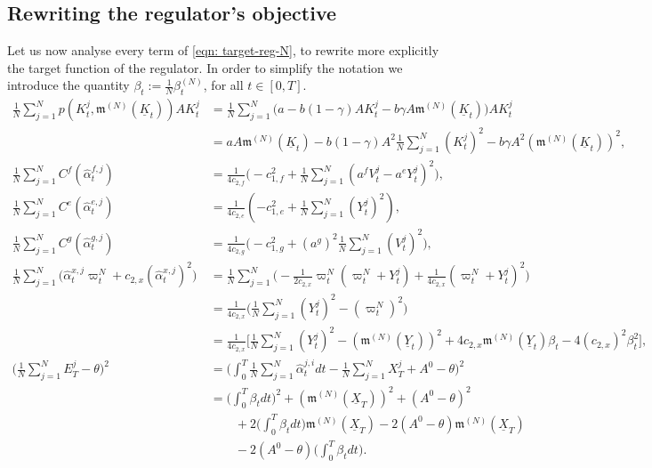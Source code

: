 \documentclass[11pt,twoside]{amsart}
\theoremstyle{definition}
\numberwithin{equation}{section}
\newcommand{\w}{\varpi}
\renewcommand{\hat}{\widehat}
\newcommand{\avg}{\frac{1}{N}\sum_{j = 1}^N}
\begin{document}
\subsection{Rewriting the regulator's objective}\label{subsect_model_N:regulator_rewritten}

Let us now analyse every term of \eqref{eqn: target-reg-N}, to rewrite more explicitly the target function of the regulator. 
In order to simplify the notation we introduce the quantity $\beta_t:=\frac{1}{N}\beta^{(N)}_t$, for all $t \in [0,T]$.
\begin{align*}
    \frac{1}{N}\sum_{j = 1}^N p(K^j_t, \mathfrak{m}^{(N)}(\underline{K}_t)) AK^j_t & = \frac{1}{N}\sum_{j = 1}^N\bigg(a- b(1-\gamma) AK^j_t - b\gamma A\mathfrak{m}^{(N)}(\underline{K}_t)\bigg) AK^j_t\\
    & = aA\mathfrak{m}^{(N)}(\underline{K}_t) - b(1-\gamma) A^2\frac{1}{N} \sum_{j = 1}^N (K^j_t)^2 - b\gamma  A^2(\mathfrak{m}^{(N)}(\underline{K}_t))^2,\\
    \frac{1}{N}\sum_{j = 1}^NC^f(\hat\alpha^{f,j}_t) 
    & =\frac{1}{4 c_{2, f}}\bigg(-c_{1,f}^2 + \avg(a^f{V}^j_t-a^e{Y}^j_t)^2\bigg),\\
    \frac{1}{N}\sum_{j = 1}^NC^e(\hat\alpha^{e,j}_t)
    &= \frac{1}{4 c_{2, e}}(-c_{1,e}^2 + \frac{1}{N}\sum_{j=1}^N(Y^j_t)^2),\\
    \avg C^g(\hat\alpha^{g,j}_t) 
    &= \frac{1}{4 c_{2, g}}\bigg(-c_{1,g}^2 + (a^g)^2\frac{1}{N}\sum_{j = 1}^N (V^j_t)^2\bigg),\\
    \avg \big( \hat \alpha^{x,j}_t \w^N_t + c_{2,x} (\hat\alpha^{x,j}_t)^2)&= \avg \Bigg( - \frac{1}{2c_{2,x}} \w^N_t(\w^N_t + Y^j_t) + \frac{1}{4c_{2,x}} (\w^N_t + Y^j_t)^2\Bigg)\\
    &= \frac{1}{4c_{2,x}}\Bigg(\avg(Y^j_t)^2  - (\w^N_t)^2\Bigg) \\
    & = \frac{1}{4c_{2,x}}\Bigg[ \avg(Y^j_t)^2 - (\mathfrak{m}^{(N)}(\underline{Y}_t))^2 + 4c_{2,x} \mathfrak{m}^{(N)}(\underline{Y}_t)\beta_t - 4(c_{2,x})^2 \beta^2_t\Bigg],\\
    \bigg(\avg E^j_T - \theta\bigg)^2 
    & = \bigg(\int_0^T \avg \hat{\alpha}^{j,i}_t dt - \avg X^j_T + A^0-\theta\bigg)^2\\
    & = \bigg (\int_0^T \beta_tdt\bigg)^2 + ( \mathfrak{m}^{(N)}(\underline{X}_T))^2 + (A^0 - \theta)^2 \\
    &\qquad + 2\bigg(\int_0^T \beta_tdt\bigg)\mathfrak{m}^{(N)}(\underline{X}_T) - 2(A^0 - \theta) \mathfrak{m}^{(N)}(\underline{X}_T)\\
    &\qquad- 2(A^0-\theta) \bigg(\int_0^T\beta_t dt\bigg).
\end{align*}
\end{document}

